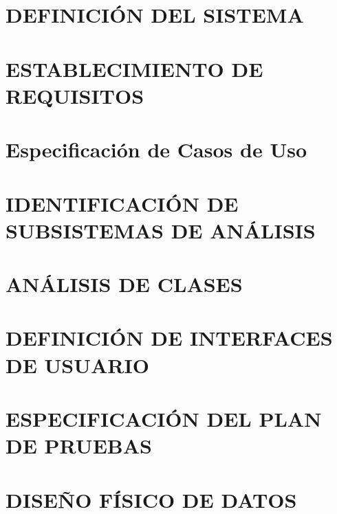 \section{DEFINICIÓN DEL SISTEMA}



\newpage
\section{ESTABLECIMIENTO DE REQUISITOS}


\newpage
\section{Especificación de Casos de Uso}


\newpage
\section{IDENTIFICACIÓN DE SUBSISTEMAS DE ANÁLISIS}



\newpage
\section{ANÁLISIS DE CLASES}



\newpage
\section{DEFINICIÓN DE INTERFACES DE USUARIO}



\newpage
\section{ESPECIFICACIÓN DEL PLAN DE PRUEBAS}


\newpage
\section{DISEÑO FÍSICO DE DATOS}
